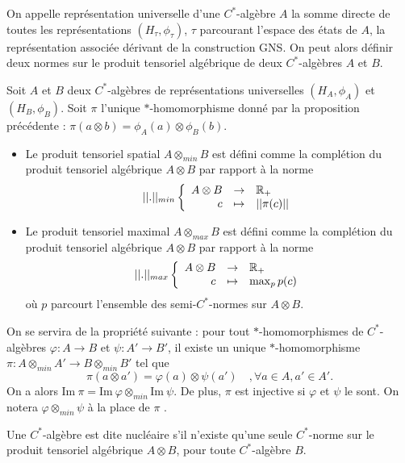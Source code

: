 On appelle représentation universelle d'une $C^*$-algèbre $A$ la somme directe de toutes les représentations $(H_\tau,\phi_\tau)$, $\tau$ parcourant l'espace des états de $A$, la représentation associée dérivant de la construction GNS. On peut alors définir deux normes sur le produit tensoriel algébrique de deux $C^*$-algèbres $A$ et $B$.

\begin{definition}
Soit $A$ et $B$ deux $C^*$-algèbres de représentations universelles $(H_A, \phi_A)$ et $(H_B, \phi_B)$. Soit $\pi$ l'unique $*$-homomorphisme donné par la proposition précédente : $\pi(a\otimes b ) = \phi_A(a)\otimes \phi_B(b)$.
\begin{itemize}
\item Le produit tensoriel spatial $A\otimes_{min} B$ est défini comme la complétion du produit tensoriel algébrique $A\otimes B$ par rapport à la norme 
\[||.||_{min}\left\{\begin{array}{rcl} A\otimes B & \rightarrow & \mathbb R_+ \\ c & \mapsto & ||\pi(c)||\end{array}\right.\]
\item Le produit tensoriel maximal $A\otimes_{max} B$ est défini comme la complétion du produit tensoriel algébrique $A\otimes B$ par rapport à la norme 
\[||.||_{max}\left\{\begin{array}{rcl} A\otimes B & \rightarrow & \mathbb R_+ \\ c & \mapsto & \max_{p} p(c)\end{array}\right.\]
où $p$ parcourt l'ensemble des semi-$C^*$-normes sur $A\otimes B$.
\end{itemize}
\end{definition}

On se servira de la propriété suivante : pour tout $*$-homomorphismes de $C^*$-algèbres $\varphi : A\rightarrow B$ et $\psi :  A'\rightarrow B'$, il existe un unique $*$-homomorphisme $\pi : A\otimes_{min} A' \rightarrow B\otimes_{min} B'$ tel que 
\[\pi(a\otimes a')=\varphi(a)\otimes \psi (a')\quad , \forall a\in A,a'\in A'.\]
On a alors $\text{Im}\ \pi = \text{Im} \ \varphi \otimes_{min} \text{Im}\ \psi$. De plus, $\pi $ est injective si $\varphi$ et $\psi$ le sont. On notera $\varphi\otimes_{min}\psi$ à la place de $\pi$ .\\

\begin{definition}
Une $C^*$-algèbre est dite nucléaire s'il n'existe qu'une seule $C^*$-norme sur le produit tensoriel algébrique $A\otimes B$, pour toute $C^*$-algèbre $B$.
\end{definition}


